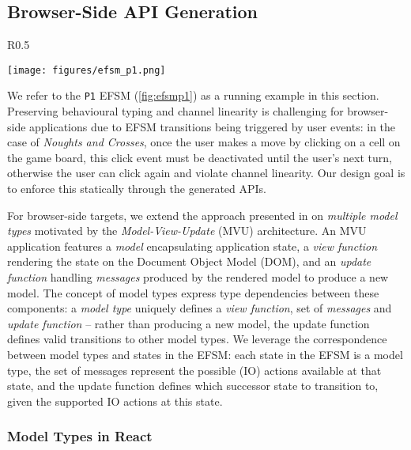 \subsection{Browser-Side API Generation}

\label{section:browser}

\begin{wrapfigure}{R}{0.5\textwidth}
  \begin{center}
    \texttt{[image: figures/efsm\_p1.png]}
  \end{center}

  \label{fig:efsmp1}
\end{wrapfigure}

We refer to the \texttt{P1} EFSM (\cref{fig:efsmp1}) as a running example in
this section.
Preserving behavioural typing and channel linearity is challenging
for browser-side applications due to EFSM transitions being triggered by user
events:
in the case of \textit{Noughts and Crosses}, once the user makes a move by
clicking on a cell on the game board, this click event must be deactivated
until the user's next turn, otherwise the user can click again and violate
channel linearity.
Our design goal is to enforce this statically through the generated APIs.

For browser-side targets, we extend the approach presented in \cite{MVU2019} on
\textit{multiple model types} motivated by the \textit{Model-View-Update} (MVU)
architecture.
An MVU application features a \textit{model} encapsulating application
state, a \textit{view function} rendering the state on the Document Object Model (DOM), and an
\textit{update function} handling \textit{messages} produced by the
rendered model to produce a new model.
The concept of model types express type dependencies between these
components: a \emph{model type} uniquely defines a \textit{view function},
set of \textit{messages} and \textit{update function} -- rather than
producing a new model, the update function defines valid transitions to
other model types.
We leverage the correspondence between model types and states in the EFSM:
each state in the EFSM is a model type, the set of messages represent
the possible (IO) actions available at that state,
and the update function defines which successor state to transition to,
given the supported IO actions at this state.

\subsubsection{Model Types in React}

